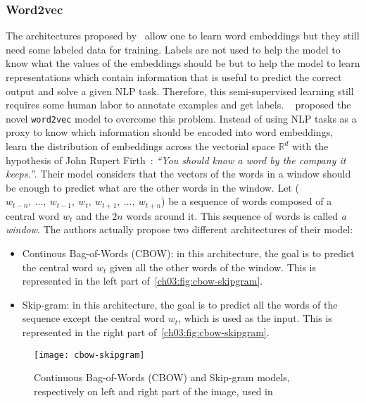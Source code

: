     \subsubsection{Word2vec}
      The architectures proposed by~\citeauthor{collobert2011natural}
      \citep{collobert2008unified, collobert2011natural} allow one to learn word
      embeddings but they still need some labeled data for training. Labels are
      not used to help the model to know what the values of the embeddings
      should be but to help the model to learn representations which contain
      information that is useful to predict the correct output and solve a given
      NLP task. Therefore, this semi-supervised learning still requires some
      human labor to annotate examples and get labels.
      \citeauthor{mikolov2013efficient}~\citep{mikolov2013efficient} proposed
      the novel \texttt{word2vec} model to overcome this problem. Instead of
      using NLP tasks as a proxy to know which information should be encoded
      into word embeddings,~\citeauthor{mikolov2013efficient} learn the
      distribution of embeddings across the vectorial space $\mathbb{R}^d$ with
      the hypothesis of John Rupert Firth~\citep{firth1961papers}: \textit{``You
      should know a word by the company it keeps.''}. Their model considers that
      the vectors of the words in a window should be enough to predict what are
      the other words in the window. Let ($w_{t-n}, ~\dots, ~w_{t-1}, ~w_t,
      ~w_{t+1}, ~\dots, ~w_{t+n}$) be a sequence of words composed of a central
      word $w_t$ and the $2n$ words around it. This sequence of words is called
      \textit{a window}. The authors actually propose two different
      architectures of their model:

      \begin{itemize}
        \item Continous Bag-of-Words (CBOW): in this architecture, the goal is
          to predict the central word $w_t$ given all the other words of the
          window. This is represented in the left part
          of~\autoref{ch03:fig:cbow-skipgram}.
        \item Skip-gram: in this architecture, the goal is to predict all the
          words of the sequence except the central word $w_t$, which is used as
          the input. This is represented in the right part
          of~\autoref{ch03:fig:cbow-skipgram}.
      \end{itemize}

      \begin{figure}[h!]
        \centering
        \texttt{[image: cbow-skipgram]}
        \caption[CBOW and Skip-gram model used
        by~\citeauthor{mikolov2013efficient}]{Continuous Bag-of-Words (CBOW) and
        Skip-gram models, respectively on left and right part of the image, used
        in~\citep{mikolov2013efficient}}
        \label{ch03:fig:cbow-skipgram}
      \end{figure}

